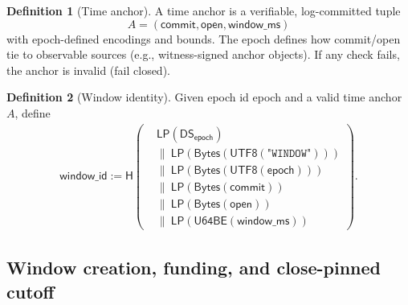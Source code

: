 \documentclass[11pt]{article}
\newcommand{\1}{\mathbf{1}}
\newcommand{\Hash}{\mathsf{H}}
\newcommand{\DS}{\mathsf{DS}}
\newcommand{\LP}{\mathsf{LP}}
\theoremstyle{definition}
\newtheorem{definition}{Definition}
\theoremstyle{plain}
\begin{document}
\begin{definition}[Time anchor]
\label{def:anchor}
A time anchor is a verifiable, log-committed tuple
\[
A=(\textsf{commit},\textsf{open},\textsf{window\_ms})
\]
with epoch-defined encodings and bounds. The epoch defines how \textsf{commit}/\textsf{open} tie to observable sources (e.g., witness-signed anchor objects). If any check fails, the anchor is invalid (fail closed).
\end{definition}

\begin{definition}[Window identity]
\label{def:window_id}
Given epoch id \textsf{epoch} and a valid time anchor $A$, define
\begin{align*}
\textsf{window\_id} := \Hash\!\left(\begin{aligned}
&\LP(\DS_{\textsf{epoch}})\\
&\|\ \LP(\mathsf{Bytes}(\textsf{UTF8}(\texttt{"WINDOW"})))\\
&\|\ \LP(\mathsf{Bytes}(\textsf{UTF8}(\textsf{epoch})))\\
&\|\ \LP(\mathsf{Bytes}(\textsf{commit}))\\
&\|\ \LP(\mathsf{Bytes}(\textsf{open}))\\
&\|\ \LP(\mathsf{U64BE}(\textsf{window\_ms}))
\end{aligned}\right).
\end{align*}
\end{definition}

\subsection{Window creation, funding, and close-pinned cutoff}
\end{document}
